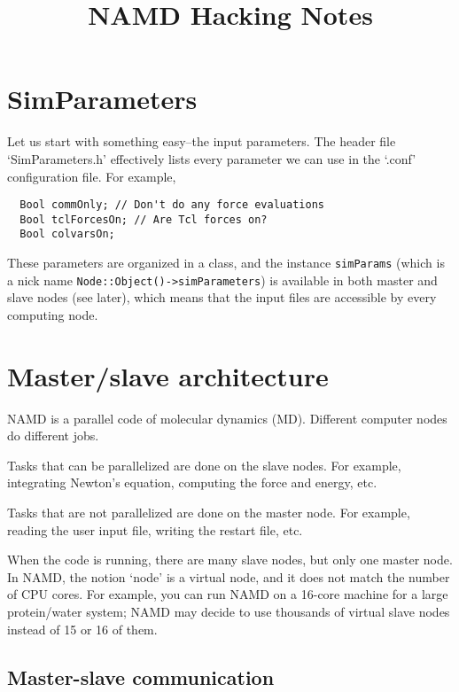 \documentclass{article}
\begin{document}
\title{NAMD Hacking Notes}
\author{ \vspace{-10ex} }
\date{ \vspace{-10ex} }


\maketitle

\tableofcontents


\section{SimParameters}

Let us start with something easy--the input parameters.
%
The header file `SimParameters.h' effectively
lists every parameter we can use in the `.conf' configuration file.
%
For example,
\begin{lstlisting}
  Bool commOnly; // Don't do any force evaluations
  Bool tclForcesOn; // Are Tcl forces on?
  Bool colvarsOn;
\end{lstlisting}
%
These parameters are organized in a class,
and the instance \texttt{simParams}
(which is a nick name \texttt{Node::Object()->simParameters})
is available in both master and slave nodes (see later),
which means that the input files are accessible
by every computing node.


\section{Master/slave architecture}

NAMD is a parallel code of molecular dynamics (MD).
%
Different computer nodes do different jobs.

Tasks that can be parallelized are done on the slave nodes.
%
For example, integrating Newton's equation, computing the force and energy, etc.

Tasks that are not parallelized are done on the master node.
%
For example, reading the user input file,
writing the restart file, etc.

When the code is running, there are many slave nodes,
but only one master node.
%
In NAMD, the notion `node' is a virtual node,
and it does not match the number of CPU cores.
%
For example, you can run NAMD on a 16-core machine
for a large protein/water system;
NAMD may decide to use thousands of virtual slave nodes
instead of 15 or 16 of them.


\subsection{Master-slave communication}
\end{document}

